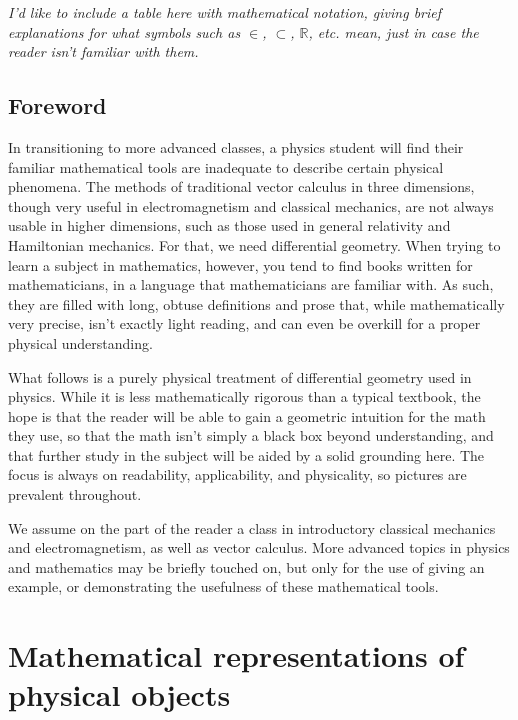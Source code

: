 \documentclass{book}
\begin{document}
\tableofcontents

\emph{I'd like to include a table here with mathematical notation, giving brief explanations for what symbols such as $\in$, $\subset$, $\mathbb{R}$, etc. mean, just in case the reader isn't familiar with them.}





\section{Foreword}
In transitioning to more advanced classes, a physics student will find their familiar mathematical tools are inadequate to describe certain physical phenomena. The methods of traditional vector calculus in three dimensions, though very useful in electromagnetism and classical mechanics, are not always usable in higher dimensions, such as those used in general relativity and Hamiltonian mechanics. For that, we need differential geometry. When trying to learn a subject in mathematics, however, you tend to find books written for mathematicians, in a language that mathematicians are familiar with. As such, they are filled with long, obtuse definitions and prose that, while mathematically very precise, isn't exactly light reading, and can even be overkill for a proper physical understanding. 

What follows is a purely physical treatment of differential geometry used in physics. While it is less mathematically rigorous than a typical textbook, the hope is that the reader will be able to gain a geometric intuition for the math they use, so that the math isn't simply a black box beyond understanding, and that further study in the subject will be aided by a solid grounding here. The focus is always on readability, applicability, and physicality, so pictures are prevalent throughout. 

We assume on the part of the reader a class in introductory classical mechanics and electromagnetism, as well as vector calculus. More advanced topics in physics and mathematics may be briefly touched on, but only for the use of giving an example, or demonstrating the usefulness of these mathematical tools. 


\chapter{Mathematical representations of physical objects}
\end{document}
